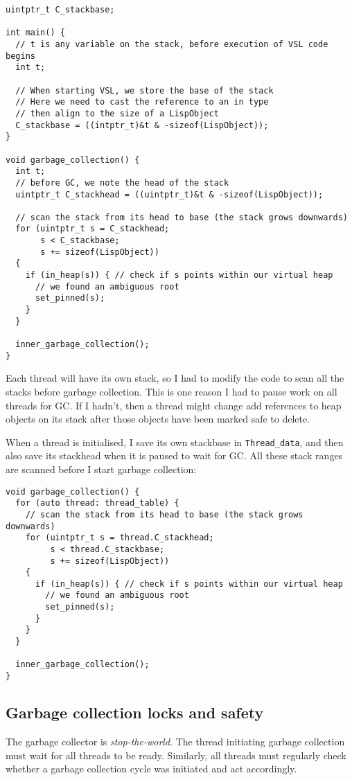 \begin{verbatim}
uintptr_t C_stackbase;

int main() {
  // t is any variable on the stack, before execution of VSL code begins
  int t;

  // When starting VSL, we store the base of the stack
  // Here we need to cast the reference to an in type
  // then align to the size of a LispObject
  C_stackbase = ((intptr_t)&t & -sizeof(LispObject));
}

void garbage_collection() {
  int t;
  // before GC, we note the head of the stack
  uintptr_t C_stackhead = ((uintptr_t)&t & -sizeof(LispObject));

  // scan the stack from its head to base (the stack grows downwards)
  for (uintptr_t s = C_stackhead;
       s < C_stackbase;
       s += sizeof(LispObject))
  {
    if (in_heap(s)) { // check if s points within our virtual heap
      // we found an ambiguous root
      set_pinned(s);
    }
  }

  inner_garbage_collection();
}
\end{verbatim}

Each thread will have its own stack, so I had to modify the code to scan all the stacks before garbage
collection. This is one reason I had to pause work on all threads for GC. If I hadn't, then a thread might
change add references to heap objects on its stack after those objects have been marked safe to delete.

When a thread is initialised, I save its own stackbase in \texttt{Thread\_data}, and then also save its stackhead
when it is paused to wait for GC. All these stack ranges are scanned before I start garbage collection:

\begin{verbatim}
void garbage_collection() {
  for (auto thread: thread_table) {
    // scan the stack from its head to base (the stack grows downwards)
    for (uintptr_t s = thread.C_stackhead;
         s < thread.C_stackbase;
         s += sizeof(LispObject))
    {
      if (in_heap(s)) { // check if s points within our virtual heap
        // we found an ambiguous root
        set_pinned(s);
      }
    }
  }

  inner_garbage_collection();
}
\end{verbatim}

\subsection{Garbage collection locks and safety}
\label{sec:gclock}
The garbage collector is \emph{stop-the-world}. The thread initiating garbage collection must wait for all
threads to be ready. Similarly, all threads must regularly check whether a garbage collection cycle was
initiated and act accordingly.

